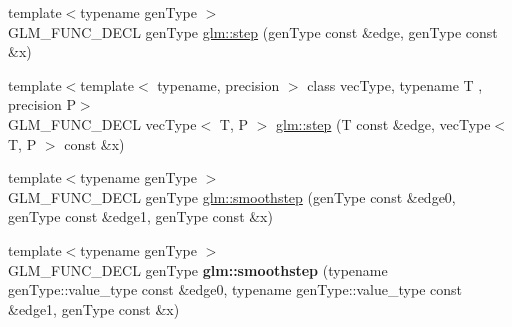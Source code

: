 \begin{DoxyCompactItemize}
\item 
{\footnotesize template$<$typename gen\+Type $>$ }\\G\+L\+M\+\_\+\+F\+U\+N\+C\+\_\+\+D\+E\+CL gen\+Type \hyperlink{group__core__func__common_gaf21c84759af7799f573865f70c2f0a86}{glm\+::step} (gen\+Type const \&edge, gen\+Type const \&x)
\item 
{\footnotesize template$<$template$<$ typename, precision $>$ class vec\+Type, typename T , precision P$>$ }\\G\+L\+M\+\_\+\+F\+U\+N\+C\+\_\+\+D\+E\+CL vec\+Type$<$ T, P $>$ \hyperlink{group__core__func__common_gae830a682901c0ba63c92a7d201bba007}{glm\+::step} (T const \&edge, vec\+Type$<$ T, P $>$ const \&x)
\item 
{\footnotesize template$<$typename gen\+Type $>$ }\\G\+L\+M\+\_\+\+F\+U\+N\+C\+\_\+\+D\+E\+CL gen\+Type \hyperlink{group__core__func__common_ga754103c8d2cdaf40f71429252457c10a}{glm\+::smoothstep} (gen\+Type const \&edge0, gen\+Type const \&edge1, gen\+Type const \&x)
\item 
{\footnotesize template$<$typename gen\+Type $>$ }\\G\+L\+M\+\_\+\+F\+U\+N\+C\+\_\+\+D\+E\+CL gen\+Type {\bfseries glm\+::smoothstep} (typename gen\+Type\+::value\+\_\+type const \&edge0, typename gen\+Type\+::value\+\_\+type const \&edge1, gen\+Type const \&x)\hypertarget{group__core__func__common_ga1e7b9e668a0bd2f494a1d49b871a50ea}{}\label{group__core__func__common_ga1e7b9e668a0bd2f494a1d49b871a50ea}


\end{DoxyCompactItemize}
